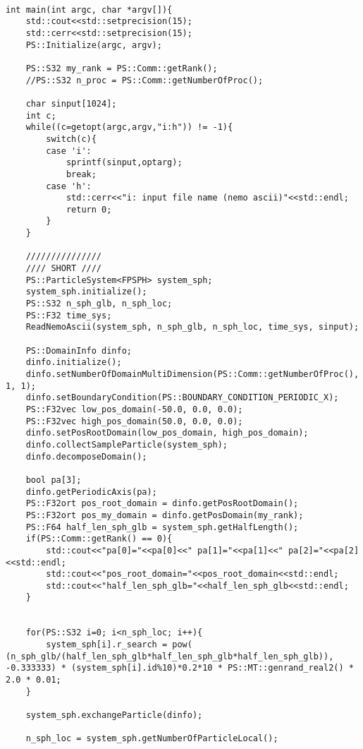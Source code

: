 \begin{lstlisting}[caption=開放境界、モートンソート、ローカルツリー構築、モーメント計算、LET交換、グローバルツリー構築、相互作用計算のテスト]

int main(int argc, char *argv[]){
    std::cout<<std::setprecision(15);
    std::cerr<<std::setprecision(15);
    PS::Initialize(argc, argv);

    PS::S32 my_rank = PS::Comm::getRank();
    //PS::S32 n_proc = PS::Comm::getNumberOfProc();

    char sinput[1024];
    int c;
    while((c=getopt(argc,argv,"i:h")) != -1){
        switch(c){
        case 'i':
            sprintf(sinput,optarg);
            break;
        case 'h':
            std::cerr<<"i: input file name (nemo ascii)"<<std::endl;
            return 0;
        }
    }

    ///////////////
    //// SHORT ////
    PS::ParticleSystem<FPSPH> system_sph;
    system_sph.initialize();
    PS::S32 n_sph_glb, n_sph_loc;
    PS::F32 time_sys;
    ReadNemoAscii(system_sph, n_sph_glb, n_sph_loc, time_sys, sinput);

    PS::DomainInfo dinfo;
    dinfo.initialize();
    dinfo.setNumberOfDomainMultiDimension(PS::Comm::getNumberOfProc(), 1, 1);
    dinfo.setBoundaryCondition(PS::BOUNDARY_CONDITION_PERIODIC_X);
    PS::F32vec low_pos_domain(-50.0, 0.0, 0.0);
    PS::F32vec high_pos_domain(50.0, 0.0, 0.0);
    dinfo.setPosRootDomain(low_pos_domain, high_pos_domain);
    dinfo.collectSampleParticle(system_sph);
    dinfo.decomposeDomain();

    bool pa[3];
    dinfo.getPeriodicAxis(pa);
    PS::F32ort pos_root_domain = dinfo.getPosRootDomain();
    PS::F32ort pos_my_domain = dinfo.getPosDomain(my_rank);
    PS::F64 half_len_sph_glb = system_sph.getHalfLength();
    if(PS::Comm::getRank() == 0){
        std::cout<<"pa[0]="<<pa[0]<<" pa[1]="<<pa[1]<<" pa[2]="<<pa[2]<<std::endl;
        std::cout<<"pos_root_domain="<<pos_root_domain<<std::endl;
        std::cout<<"half_len_sph_glb="<<half_len_sph_glb<<std::endl;
    }


    for(PS::S32 i=0; i<n_sph_loc; i++){
        system_sph[i].r_search = pow( (n_sph_glb/(half_len_sph_glb*half_len_sph_glb*half_len_sph_glb)), -0.333333) * (system_sph[i].id%10)*0.2*10 * PS::MT::genrand_real2() * 2.0 * 0.01;
    }

    system_sph.exchangeParticle(dinfo);

    n_sph_loc = system_sph.getNumberOfParticleLocal();


\end{lstlisting}
